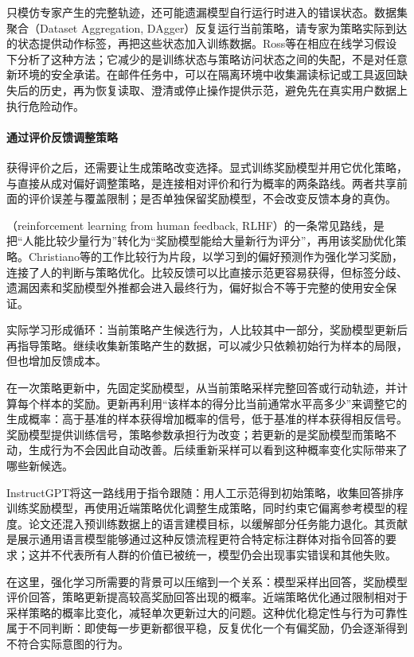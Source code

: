 只模仿专家产生的完整轨迹，还可能遗漏模型自行运行时进入的错误状态。数据集聚合（Dataset Aggregation, DAgger）反复运行当前策略，请专家为策略实际到达的状态提供动作标签，再把这些状态加入训练数据。Ross等在相应在线学习假设下分析了这种方法；它减少的是训练状态与策略访问状态之间的失配，不是对任意新环境的安全承诺。在邮件任务中，可以在隔离环境中收集漏读标记或工具返回缺失后的历史，再为恢复读取、澄清或停止操作提供示范，避免先在真实用户数据上执行危险动作。

\paragraph{通过评价反馈调整策略}

获得评价之后，还需要让生成策略改变选择。显式训练奖励模型并用它优化策略，与直接从成对偏好调整策略，是连接相对评价和行为概率的两条路线。两者共享前面的评价误差与覆盖限制；是否单独保留奖励模型，不会改变反馈本身的真伪。

（reinforcement learning from human feedback, RLHF）的一条常见路线，是把“人能比较少量行为”转化为“奖励模型能给大量新行为评分”，再用该奖励优化策略。Christiano等的工作比较行为片段，以学习到的偏好预测作为强化学习奖励，连接了人的判断与策略优化。比较反馈可以比直接示范更容易获得，但标签分歧、遗漏因素和奖励模型外推都会进入最终行为，偏好拟合不等于完整的使用安全保证。

实际学习形成循环：当前策略产生候选行为，人比较其中一部分，奖励模型更新后再指导策略。继续收集新策略产生的数据，可以减少只依赖初始行为样本的局限，但也增加反馈成本。

在一次策略更新中，先固定奖励模型，从当前策略采样完整回答或行动轨迹，并计算每个样本的奖励。更新再利用“该样本的得分比当前通常水平高多少”来调整它的生成概率：高于基准的样本获得增加概率的信号，低于基准的样本获得相反信号。奖励模型提供训练信号，策略参数承担行为改变；若更新的是奖励模型而策略不动，生成行为不会因此自动改善。后续重新采样可以看到这种概率变化实际带来了哪些新候选。

InstructGPT将这一路线用于指令跟随：用人工示范得到初始策略，收集回答排序训练奖励模型，再使用近端策略优化调整生成策略，同时约束它偏离参考模型的程度。论文还混入预训练数据上的语言建模目标，以缓解部分任务能力退化。其贡献是展示通用语言模型能够通过这种反馈流程更符合特定标注群体对指令回答的要求；这并不代表所有人群的价值已被统一，模型仍会出现事实错误和其他失败。

在这里，强化学习所需要的背景可以压缩到一个关系：模型采样出回答，奖励模型评价回答，策略更新提高较高奖励回答出现的概率。近端策略优化通过限制相对于采样策略的概率比变化，减轻单次更新过大的问题。这种优化稳定性与行为可靠性属于不同判断：即使每一步更新都很平稳，反复优化一个有偏奖励，仍会逐渐得到不符合实际意图的行为。

